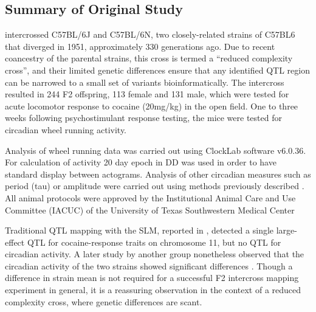     \subsection{Summary of Original Study}

    \citet{Kumar2013} intercrossed C57BL/6J and C57BL/6N, two closely-related strains of C57BL6 that diverged in 1951, approximately 330 generations ago.
    Due to recent coancestry of the parental strains, this cross is termed a ``reduced complexity cross'', and their limited genetic differences ensure that any identified QTL region can be narrowed to a small set of variants bioinformatically.
    The intercross resulted in 244 F2 offspring, 113 female and 131 male, which were tested for acute locomotor response to cocaine (20mg/kg) in the open field.
    One to three weeks following psychostimulant response testing, the mice were tested for circadian wheel running activity.

    Analysis of wheel running data was carried out using ClockLab software v6.0.36.
    For calculation of activity 20 day epoch in DD was used in order to have standard display between actograms.
    Analysis of other circadian measures such as period (tau) or amplitude were carried out using methods previously described \citep{Shimomura2001}.
    All animal protocols were approved by the Institutional Animal Care and Use Committee (IACUC) of the University of Texas Southwestern Medical Center

    Traditional QTL mapping with the SLM, reported in \citet{Kumar2013}, detected a single large-effect QTL for cocaine-response traits on chromosome 11, but no QTL for circadian activity.
    A later study by another group nonetheless observed that the circadian activity of the two strains showed significant differences \citep{Banks2015}.
    Though a difference in strain mean is not required for a successful F2 intercross mapping experiment in general, it is a reassuring observation in the context of a reduced complexity cross, where genetic differences are scant.


